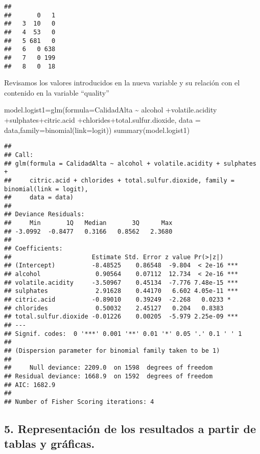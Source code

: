 \documentclass[
]{article}
\newenvironment{Shaded}{\begin{snugshade}}{\end{snugshade}}
\newcommand{\AttributeTok}[1]{\textcolor[rgb]{0.77,0.63,0.00}{#1}}
\newcommand{\FunctionTok}[1]{\textcolor[rgb]{0.00,0.00,0.00}{#1}}
\newcommand{\NormalTok}[1]{#1}
\newcommand{\OtherTok}[1]{\textcolor[rgb]{0.56,0.35,0.01}{#1}}
\newcommand{\SpecialCharTok}[1]{\textcolor[rgb]{0.00,0.00,0.00}{#1}}
\begin{document}
\begin{verbatim}
##    
##       0   1
##   3  10   0
##   4  53   0
##   5 681   0
##   6   0 638
##   7   0 199
##   8   0  18
\end{verbatim}

Revisamos los valores introducidos en la nueva variable y su relación
con el contenido en la variable ``quality''

\begin{Shaded}
\begin{Highlighting}[]
\NormalTok{model.logist1}\OtherTok{=}\FunctionTok{glm}\NormalTok{(}\AttributeTok{formula=}\NormalTok{CalidadAlta }\SpecialCharTok{\textasciitilde{}}\NormalTok{ alcohol }\SpecialCharTok{+}\NormalTok{volatile.acidity }\SpecialCharTok{+}\NormalTok{sulphates}\SpecialCharTok{+}\NormalTok{citric.acid }\SpecialCharTok{+}\NormalTok{chlorides}\SpecialCharTok{+}\NormalTok{total.sulfur.dioxide,   }\AttributeTok{data =}\NormalTok{ data,}\AttributeTok{family=}\FunctionTok{binomial}\NormalTok{(}\AttributeTok{link=}\NormalTok{logit))}
\FunctionTok{summary}\NormalTok{(model.logist1)}
\end{Highlighting}
\end{Shaded}

\begin{verbatim}
## 
## Call:
## glm(formula = CalidadAlta ~ alcohol + volatile.acidity + sulphates + 
##     citric.acid + chlorides + total.sulfur.dioxide, family = binomial(link = logit), 
##     data = data)
## 
## Deviance Residuals: 
##     Min       1Q   Median       3Q      Max  
## -3.0992  -0.8477   0.3166   0.8562   2.3680  
## 
## Coefficients:
##                      Estimate Std. Error z value Pr(>|z|)    
## (Intercept)          -8.48525    0.86548  -9.804  < 2e-16 ***
## alcohol               0.90564    0.07112  12.734  < 2e-16 ***
## volatile.acidity     -3.50967    0.45134  -7.776 7.48e-15 ***
## sulphates             2.91628    0.44170   6.602 4.05e-11 ***
## citric.acid          -0.89010    0.39249  -2.268   0.0233 *  
## chlorides             0.50032    2.45127   0.204   0.8383    
## total.sulfur.dioxide -0.01226    0.00205  -5.979 2.25e-09 ***
## ---
## Signif. codes:  0 '***' 0.001 '**' 0.01 '*' 0.05 '.' 0.1 ' ' 1
## 
## (Dispersion parameter for binomial family taken to be 1)
## 
##     Null deviance: 2209.0  on 1598  degrees of freedom
## Residual deviance: 1668.9  on 1592  degrees of freedom
## AIC: 1682.9
## 
## Number of Fisher Scoring iterations: 4
\end{verbatim}

\hypertarget{representaciuxf3n-de-los-resultados-a-partir-de-tablas-y-gruxe1ficas.}{%
\subsection{5. Representación de los resultados a partir de tablas y
gráficas.}\label{representaciuxf3n-de-los-resultados-a-partir-de-tablas-y-gruxe1ficas.}}
\end{document}
